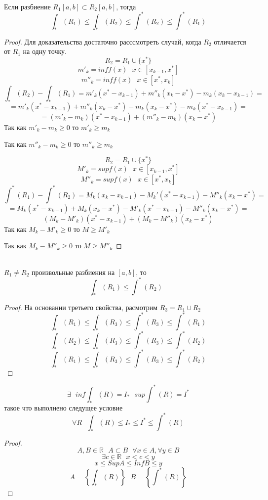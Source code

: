 \\
Если разбиение $R_1 [a,b] \subset R_2 [a,b]$, тогда
\[\int_* (R_1) \le \int_* (R_2) \le \int^* (R_2) \le \int^* (R_1)\]

\begin{proof}
  Для доказательства достаточно расссмотреть случай, когда $R_2$ отличается от
  $R_1$ на одну точку.
  \[R_2 = R_1 \cup \{x^*\}\]
  \[m'_k = inf f(x) ~~~ x \in [x_{k - 1}, x^*]\]
  \[m''_k = inf f(x) ~~~ x \in [x^*, x_k]\]
  \[
     \int_* (R_2) - \int_* (R_1) = m'_k (x^* - x_{k-1}) + m''_k (x_k - x^*) -
     m_k (x_k - x_{k - 1}) =
  \]
  \[
     = m'_k (x^* - x_{k - 1}) + m''_k (x_k - x^*) - m_k (x_k - x^*) -
     m_k (x^* - x_{k - 1}) =
  \]
  \[
     = (m'_k - m_k)(x^* - x_{k - 1}) + (m''_k - m_k)
     (x_k - x^*)
  \]
  Так как $m'_k - m_k \ge 0$ то $m'_k \ge m_k$

  Так как $m''_k - m_k \ge 0$ то $m''_k \ge m_k$

  $$
  R_2 = R_1 \cup \{x^*\}
  $$
  $$
  M'_k = sup f(x) ~~~ x \in [x_{k-1}, x^*]
  $$
  $$
  M''_k = sup f(x) ~~~ x \in [x^*, x_k]
  $$
  $$
  \int^* (R_1) - \int^*(R_2) = M_k(x_k - x_{k-1}) - M_k'(x^* - x_{k-1})
  - M''_k(x_k - x^*) =
  $$
  $$
  = M_k(x^* - x_{k-1}) + M_k(x_k - x^*) - M'_k(x^* - x_{k-1}) -
  M''_k(x_k - x^*) =
  $$
  $$
  (M_k - M'_k)(x^* - x_{k-1}) + (M_k - M''_k)(x_k - x^*)
  $$
  Так как $M_k - M'_k \ge 0$ то $M \ge M'_k$

  Так как $M_k - M''_k \ge 0$ то $M \ge M''_k$
\end{proof}

\\
$R_1 \not= R_2$ произвольные разбиения на $[a,b]$, то
\[\int_* (R_1) \le \int^* (R_2) ~~~ \]

\begin{proof}
  На основании третьего свойства, расмотрим $R_3 = R_1 \cup R_2$
  \[\int_* (R_1) \le \int_* (R_3) \le \int^* (R_3) \le \int^* (R_1)\]
  \[\int_* (R_2) \le \int_* (R_3) \le \int^* (R_3) \le \int^* (R_2)\]
  \[\int_* (R_1) \le \int_* (R_3) \le \int^* (R_3) \le \int^* (R_2)\]
\end{proof}

$$
\exists ~~~ inf \int_* (R) = I_* ~~~ sup \int^* (R) = I^*
$$
такое что выполнено следущее условие
\[\forall R ~~~ \int_* (R) \le I_* \le I^* \le \int^* (R)\]

\begin{proof}
  \[
  A, B \in \mathbb R ~~~ A \subset B ~~~ \forall x \in A, \forall y \in B
  \]
  \[\exists c \in \mathbb R ~~~ x < c < y\]
  \[x \le Sup A \le Inf B \le y\]
  \[A = \left\{ \int_* (R) \right\} ~~~ B = \left\{ \int^* (R) \right\}\]
\end{proof}

